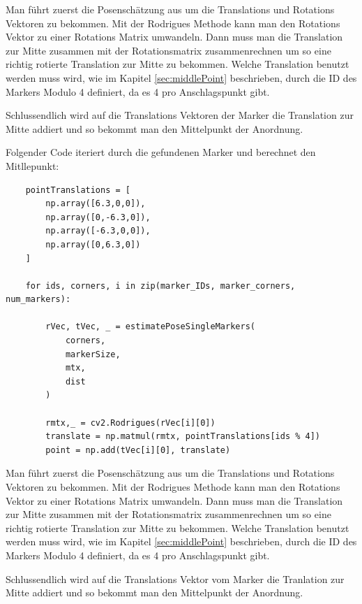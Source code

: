 Man führt zuerst die Posenschätzung aus um die Translations und Rotations Vektoren zu bekommen.
Mit der Rodrigues Methode kann man den Rotations Vektor zu einer Rotations Matrix umwandeln.
Dann muss man die Translation zur Mitte zusammen mit der Rotationsmatrix zusammenrechnen um so eine richtig rotierte Translation zur Mitte zu bekommen.
Welche Translation benutzt werden muss wird, wie im Kapitel \ref{sec:middlePoint} beschrieben, durch die ID des Markers Modulo 4 definiert, da es 4 pro Anschlagspunkt gibt.

Schlussendlich wird auf die Translations Vektoren der Marker die Translation zur Mitte addiert 
und so bekommt man den Mittelpunkt der Anordnung. \clearpage


Folgender Code iteriert durch die gefundenen Marker und berechnet den Mitllepunkt: 


\begin{lstlisting}
    pointTranslations = [
        np.array([6.3,0,0]),
        np.array([0,-6.3,0]),
        np.array([-6.3,0,0]),
        np.array([0,6.3,0])
    ]

    for ids, corners, i in zip(marker_IDs, marker_corners, num_markers):
        
        rVec, tVec, _ = estimatePoseSingleMarkers(
            corners,
            markerSize, 
            mtx, 
            dist
        )
    
        rmtx,_ = cv2.Rodrigues(rVec[i][0])
        translate = np.matmul(rmtx, pointTranslations[ids % 4])
        point = np.add(tVec[i][0], translate)
\end{lstlisting}

Man führt zuerst die Posenschätzung aus um die Translations und Rotations Vektoren zu bekommen.
Mit der Rodrigues Methode kann man den Rotations Vektor zu einer Rotations Matrix umwandeln.
Dann muss man die Translation zur Mitte zusammen mit der Rotationsmatrix zusammenrechnen um so eine richtig rotierte Translation zur Mitte zu bekommen.
Welche Translation benutzt werden muss wird, wie im Kapitel \ref{sec:middlePoint} beschrieben, durch die ID des Markers Modulo 4 definiert, da es 4 pro Anschlagspunkt gibt.

Schlussendlich wird auf die Translations Vektor vom Marker die Tranlation zur Mitte addiert und so bekommt man den Mittelpunkt der Anordnung.


